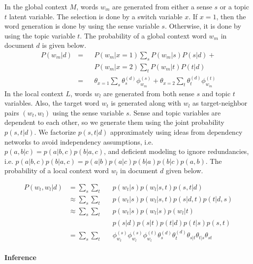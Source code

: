 \documentclass[letterpaper]{article}
\begin{document}
In the global context $M$, words $w_m$ are generated from either a sense $s$ or a topic $t$ latent variable. The selection is done by a switch variable $x$. If $x=1$, then the word generation is done by using the sense variable $s$. Otherwise, it is done by using the topic variable $t$. The probability of a global context word $w_m$ in document $d$ is given below.
\begin{align*}
    P(w_m|d)
    &= &&P(w_m|x=1) \sum_s P(w_m|s) P(s|d) + \\
    & &&P(w_m|x=2) \sum_t P(w_m|t) P(t|d) \\
    &= &&\theta_{x=1} \sum_s \theta^{(d)}_s \phi^{(s)}_{w_m} + \theta_{x=2} \sum_t \theta^{(d)}_t \phi^{(t)}_{w_m} \nonumber
\end{align*}
In the local context $L$, words $w_l$ are generated from both sense $s$ and topic $t$ variables. Also, the target word $w_t$ is generated along with $w_l$ as target-neighbor pairs $(w_t,w_l)$ using the sense variable $s$. Sense and topic variables are dependent to each other, so we generate them using the joint probability $p(s,t|d)$. We factorize $p(s,t|d)$ approximately using ideas from dependency networks  \cite{heckerman2000dependency} to avoid independency assumptions, i.e. $p(a,b|c)=p(a|b,c)p(b|a,c)$, and deficient modeling \cite{brown1993mathematics} to ignore redundancies, i.e. $p(a|b,c)p(b|a,c)=p(a|b)p(a|c)p(b|a)p(b|c)p(a,b)$. The probability of a local context word $w_l$ in document $d$ given below.

\begin{align*}
    P(w_t,w_l|d)
    &= \sum_s \sum_t && p(w_t|s) p(w_l|s,t) p(s,t|d) \\
    &\approx \sum_s \sum_t && p(w_t|s) p(w_l|s,t) p(s|d,t) p(t|d,s) \\
    &\approx \sum_s \sum_t && p(w_t|s) p(w_l|s) p(w_l|t) \\ & && p(s|d) p(s|t) p(t|d) p(t|s) p(s,t) \\
    &= \sum_s \sum_t && \phi^{(s)}_{w_t} \phi^{(s)}_{w_l} \phi^{(t)}_{w_l} \theta^{(d)}_s \theta^{(d)}_t \theta_{s|t} \theta_{t|s} \theta_{st} \nonumber
\end{align*}
\paragraph{Inference}
\end{document}
